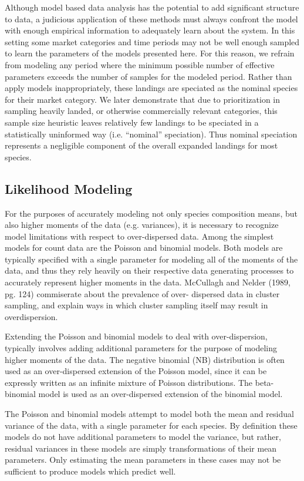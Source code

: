 \documentclass[12pt]{article}
\begin{document}
Although model based data analysis has the potential to add significant
structure to data, a judicious application of these methods must always
confront the model with enough empirical information to adequately learn
about the system. In this setting some market categories and time
periods may not be well enough sampled to learn the parameters of the
models presented here. For this reason, we refrain from modeling any
period where the minimum possible number of effective parameters exceeds
the number of samples for the modeled period. Rather than apply models
inappropriately, these landings are speciated as the nominal species for
their market category. We later demonstrate that due to prioritization
in sampling heavily landed, or otherwise commercially relevant
categories, this sample size heuristic leaves relatively few landings to
be speciated in a statistically uninformed way (i.e. ``nominal''
speciation). Thus nominal speciation represents a negligible component
of the overall expanded landings for most species.

\subsection{Likelihood Modeling}\label{likelihoods}

For the purposes of accurately modeling not only species composition
means, but also higher moments of the data (e.g. variances), it is necessary 
to recognize model limitations with respect to over-dispersed data. Among the 
simplest models for count data are the Poisson and binomial models. Both 
models are typically specified with a single parameter for modeling all of the 
moments of the data, and thus they rely heavily on their respective data 
generating processes to accurately represent higher moments in the data. 
McCullagh and Nelder (1989, pg. 124) commiserate about the prevalence of over-
dispersed data in cluster sampling, and explain ways in which cluster sampling 
itself may result in overdispersion.

Extending the Poisson and binomial models to deal with over-dispersion,
typically involves adding additional parameters for the purpose of
modeling higher moments of the data. The negative binomial (NB)
distribution is often used as an over-dispersed extension of the Poisson
model, since it can be expressly written as an infinite mixture of
Poisson distributions. The beta-binomial model is used as an
over-dispersed extension of the binomial model.

The Poisson and binomial models attempt to model both the mean and
residual variance of the data, with a single parameter for each species.
By definition these models do not have additional parameters to model
the variance, but rather, residual variances in these models are simply
transformations of their mean parameters. Only estimating the mean
parameters in these cases may not be sufficient to produce models which
predict well.
\end{document}
